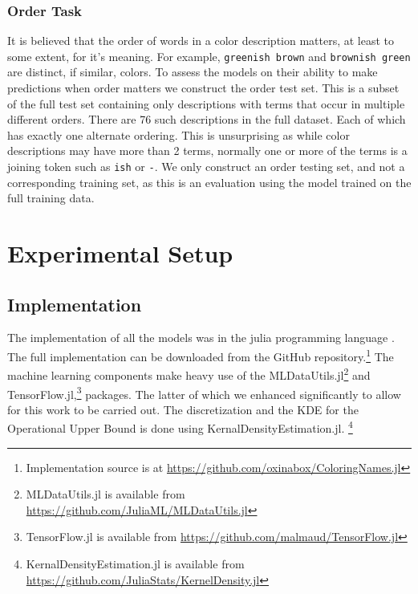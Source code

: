 \documentclass[]{book}
\newcommand{\parencite}{\citep}
\newcommand{\natlang}[1]{\texttt{#1}}
\begin{document}
\subsubsection{Order Task}
It is believed that the order of words in a color description matters, at least to some extent, for it's meaning.
For example, \natlang{greenish brown} and \natlang{brownish green} are distinct, if similar, colors.
To assess the models on their ability to make predictions when order matters we construct the order test set.
This is a subset of the full test set containing only descriptions with terms that occur in multiple different orders.
There are 76 such descriptions in the full dataset.
Each of which has exactly one alternate ordering.
This is unsurprising as while color descriptions may have more than 2 terms, normally one or more of the terms is a joining token such as \natlang{ish} or \natlang{-}.
We only construct an order testing set, and not a corresponding training set, as this is an evaluation using the model trained on the full training data.




\section{Experimental Setup}

\subsection{Implementation}
The implementation of all the models was in the julia programming language \parencite{Julia}.
The full implementation can be downloaded from the GitHub repository.\footnote{Implementation source is at \url{https://github.com/oxinabox/ColoringNames.jl}}
The machine learning components make heavy use of the MLDataUtils.jl\footnote{MLDataUtils.jl is available from \url{https://github.com/JuliaML/MLDataUtils.jl}} and TensorFlow.jl,\footnote{TensorFlow.jl is available from \url{https://github.com/malmaud/TensorFlow.jl}} packages.
The latter of which we enhanced significantly to allow for this work to be carried out.
The discretization and the KDE for the Operational Upper Bound is done using KernalDensityEstimation.jl.%
\footnote{KernalDensityEstimation.jl  is available from \url{https://github.com/JuliaStats/KernelDensity.jl}}
\end{document}
